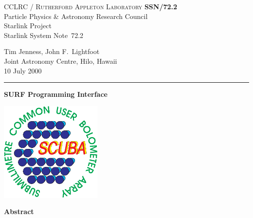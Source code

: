 \documentclass[twoside,11pt]{article}
\newcommand{\stardoccategory}  {Starlink System Note}
\newcommand{\stardocinitials}  {SSN}
\newcommand{\stardocnumber}    {72.2}
\newcommand{\stardocauthors}   {Tim Jenness, John F.\ Lightfoot\\
                                Joint Astronomy Centre, Hilo, Hawaii}
\newcommand{\stardocdate}      {10 July 2000}
\newcommand{\stardoctitle}     {SURF Programming Interface}
\newcommand{\stardocname}{\stardocinitials /\stardocnumber}
\newenvironment{latexonly}{}{}
\renewcommand{\_}{\texttt{\symbol{95}}}
\begin{document}
\thispagestyle{empty}

\begin{latexonly}
   CCLRC / \textsc{Rutherford Appleton Laboratory} \hfill \textbf{\stardocname}\\
   {\large Particle Physics \& Astronomy Research Council}\\
   {\large Starlink Project\\}
   {\large \stardoccategory\ \stardocnumber}
   \begin{flushright}
   \stardocauthors\\
   \stardocdate
   \end{flushright}
   \vspace{-4mm}
   \rule{\textwidth}{0.5mm}
   \vspace{5mm}
   \begin{center}
   {\Large\textbf{\stardoctitle}}
   \end{center}
   \vspace{5mm}

\begin{center}
\includegraphics[width=2.0in]{ssn72_logo.eps}
\end{center}

   \vspace{10mm}
   \begin{center}
      {\Large\textbf{Abstract}}
   \end{center}
\end{latexonly}
\end{document}
